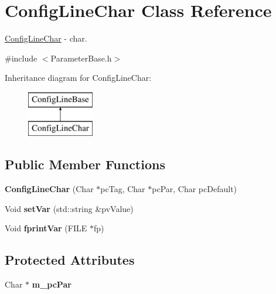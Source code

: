 \hypertarget{class_config_line_char}{}\section{Config\+Line\+Char Class Reference}
\label{class_config_line_char}


\hyperlink{class_config_line_char}{Config\+Line\+Char} -\/ char.  




{\ttfamily \#include $<$Parameter\+Base.\+h$>$}

Inheritance diagram for Config\+Line\+Char\+:\begin{figure}[H]
\begin{center}
\leavevmode
\includegraphics[height=2.000000cm]{class_config_line_char}
\end{center}
\end{figure}
\subsection*{Public Member Functions}
\begin{DoxyCompactItemize}
\item 
\mbox{\label{class_config_line_char_a18719543fcad7ac60c01ae3fe06625fd}} 
{\bfseries Config\+Line\+Char} (Char $\ast$pc\+Tag, Char $\ast$pc\+Par, Char pc\+Default)
\item 
\mbox{\label{class_config_line_char_a33253f8db8fc3e20da3aa2ba8e2e96ce}} 
Void {\bfseries set\+Var} (std\+::string \&pv\+Value)
\item 
\mbox{\label{class_config_line_char_a9fb1ca4537a8c99068676f9695cb151e}} 
Void {\bfseries fprint\+Var} (F\+I\+LE $\ast$fp)
\end{DoxyCompactItemize}
\subsection*{Protected Attributes}
\begin{DoxyCompactItemize}
\item 
\mbox{\label{class_config_line_char_aa8f1a92941f5ab3bcaab0f8aa852256e}} 
Char $\ast$ {\bfseries m\+\_\+pc\+Par}
\end{DoxyCompactItemize}
